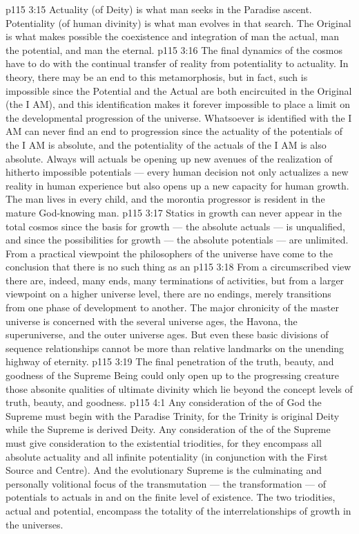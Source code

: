 \vs p115 3:15 Actuality (of Deity) is what man seeks in the Paradise ascent. Potentiality (of human divinity) is what man evolves in that search. The Original is what makes possible the coexistence and integration of man the actual, man the potential, and man the eternal.
\vs p115 3:16 \pc The final dynamics of the cosmos have to do with the continual transfer of reality from potentiality to actuality. In theory, there may be an end to this metamorphosis, but in fact, such is impossible since the Potential and the Actual are both encircuited in the Original (the I AM), and this identification makes it forever impossible to place a limit on the developmental progression of the universe. Whatsoever is identified with the I AM can never find an end to progression since the actuality of the potentials of the I AM is absolute, and the potentiality of the actuals of the I AM is also absolute. Always will actuals be opening up new avenues of the realization of hitherto impossible potentials --- every human decision not only actualizes a new reality in human experience but also opens up a new capacity for human growth. The man lives in every child, and the morontia progressor is resident in the mature God\hyp{}knowing man.
\vs p115 3:17 Statics in growth can never appear in the total cosmos since the basis for growth --- the absolute actuals --- is unqualified, and since the possibilities for growth --- the absolute potentials --- are unlimited. From a practical viewpoint the philosophers of the universe have come to the conclusion that there is no such thing as an 
\vs p115 3:18 From a circumscribed view there are, indeed, many ends, many terminations of activities, but from a larger viewpoint on a higher universe level, there are no endings, merely transitions from one phase of development to another. The major chronicity of the master universe is concerned with the several universe ages, the Havona, the superuniverse, and the outer universe ages. But even these basic divisions of sequence relationships cannot be more than relative landmarks on the unending highway of eternity.
\vs p115 3:19 The final penetration of the truth, beauty, and goodness of the Supreme Being could only open up to the progressing creature those absonite qualities of ultimate divinity which lie beyond the concept levels of truth, beauty, and goodness.
\vs p115 4:1 Any consideration of the  of God the Supreme must begin with the Paradise Trinity, for the Trinity is original Deity while the Supreme is derived Deity. Any consideration of the  of the Supreme must give consideration to the existential triodities, for they encompass all absolute actuality and all infinite potentiality (in conjunction with the First Source and Centre). And the evolutionary Supreme is the culminating and personally volitional focus of the transmutation --- the transformation --- of potentials to actuals in and on the finite level of existence. The two triodities, actual and potential, encompass the totality of the interrelationships of growth in the universes.
